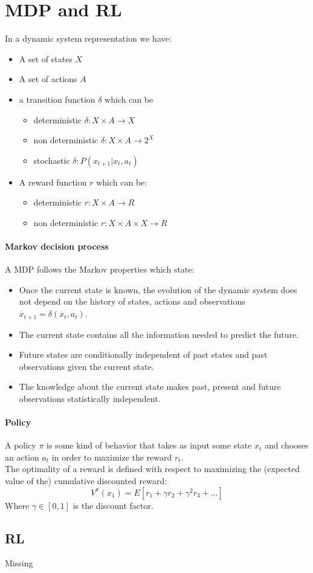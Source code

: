 \section{MDP and RL}
In a dynamic system representation we have:
\begin{itemize}
\item A set of states $X$
\item A set of actions $A$
\item a transition function $\delta$  which can be 
\begin{itemize}
\item deterministic $\delta : X\times A \to X$
\item non deterministic $\delta : X\times A \to 2^X$
\item stochastic $\delta : P(x_{t+1}|x_t,a_t)$
\end{itemize}
\item A reward function $r$ which can be:
\begin{itemize}
\item deterministic $r: X \times A \to R$
\item non deterministic $r: X \times A \times X \to R$
\end{itemize}
\end{itemize}

\paragraph{Markov decision process}
A MDP follows the Markov properties which state:
\begin{itemize}
\item Once the current state is known, the evolution of the dynamic system does not depend on the history of states, actions and observations $x_{t+1}=\delta(x_t,a_t)$.
\item The current state contains all the information needed to predict the future.
\item Future states are conditionally independent of past states and past observations given the current state.
\item The knowledge about the current state makes past, present and future observations statistically independent.
\end{itemize}

\paragraph{Policy}
A policy $\pi$ is some kind of behavior that takes as input some state $x_t$ and chooses an action $a_t$  in order to maximize the reward $r_t$.\\
The optimality of a reward is defined with respect to maximizing the (expected value of the) cumulative discounted reward:
$$V^{\pi}(x_1)=E[r_1+\gamma r_2+\gamma^2 r_3+\dots]$$
Where $\gamma \in [0,1]$ is the discount factor.

\subsection{RL}
Missing